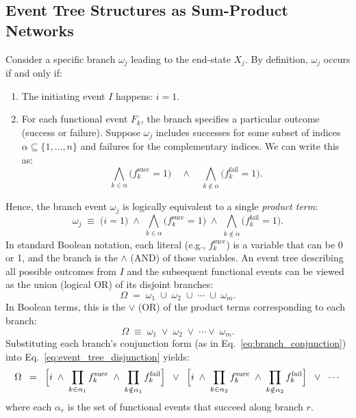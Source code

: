 \subsection{Event Tree Structures as Sum-Product Networks}
Consider a specific branch \(\omega_j\) leading to the end-state \(X_j\).  By definition, \(\omega_j\) occurs if and only if:
\begin{enumerate}
    \item The initiating event \(I\) happens: \(i=1\).
    \item For each functional event \(F_k\), the branch specifies a particular outcome (success or failure).  Suppose \(\omega_j\) includes successes for some subset of indices \(\alpha\subseteq \{1,\ldots,n\}\) and failures for the complementary indices.  We can write this as:
    \[
        \bigwedge_{k\in \alpha}  \bigl(f_{k}^{\text{succ}} = 1\bigr)
        \quad\wedge\quad
        \bigwedge_{k\notin \alpha} \bigl(f_{k}^{\text{fail}} = 1\bigr).
    \]
\end{enumerate}
Hence, the branch event \(\omega_j\) is logically equivalent to a single \emph{product term}:
\begin{equation}
\label{eq:branch_conjunction}
    \omega_j \;\equiv\; 
    \bigl(i=1\bigr)
    \;\wedge\;
    \bigwedge_{k\in \alpha} \bigl(f_k^{\text{succ}}=1\bigr)
    \;\wedge\;
    \bigwedge_{k\notin \alpha} \bigl(f_k^{\text{fail}}=1\bigr).
\end{equation}
In standard Boolean notation, each literal (e.g., \(f_k^{\text{succ}}\)) is a variable that can be 0 or 1, and the branch is the \(\land\) (AND) of those variables. An event tree describing all possible outcomes from \(I\) and the subsequent functional events can be viewed as the union (logical OR) of its disjoint branches:
\[
    \Omega \;=\; \omega_1 \;\cup\; \omega_2 \;\cup\;\cdots \;\cup\; \omega_m.
\]
In Boolean terms, this is the \(\lor\) (OR) of the product terms corresponding to each branch:
\begin{equation}
\label{eq:event_tree_disjunction}
    \Omega
    \;\equiv\;
    \omega_1
    \;\lor\;
    \omega_2
    \;\lor\;\cdots\lor\;
    \omega_m.
\end{equation}
Substituting each branch’s conjunction form (as in Eq.~\eqref{eq:branch_conjunction}) into Eq.~\eqref{eq:event_tree_disjunction} yields:
\[
    \Omega 
    \;\;=\;\;
    \Bigl[
        i \;\wedge\; \prod_{k\in \alpha_1} f_k^{\text{succ}} \;\wedge\; \prod_{k\notin \alpha_1} f_k^{\text{fail}}
    \Bigr]
    \;\;\lor\;\;
    \Bigl[
        i \;\wedge\; \prod_{k\in \alpha_2} f_k^{\text{succ}} \;\wedge\; \prod_{k\notin \alpha_2} f_k^{\text{fail}}
    \Bigr]
    \;\;\lor\;\;
    \cdots
\]
where each \(\alpha_r\) is the set of functional events that succeed along branch \(r\).

